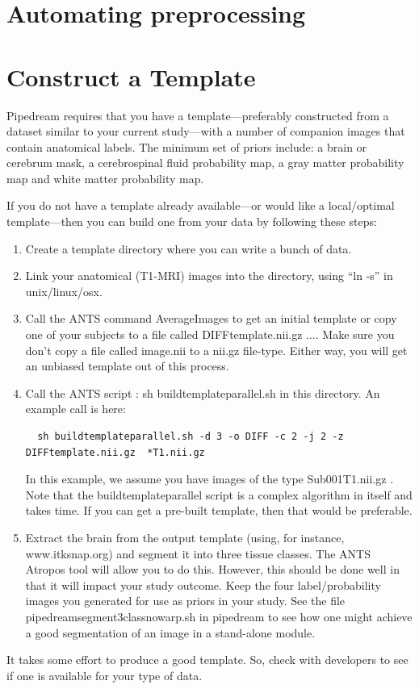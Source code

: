 \documentclass{InsightArticle}
\begin{document}


\section{Automating preprocessing}




\section{Construct a Template}
Pipedream requires that you have a template---preferably constructed
from a dataset similar to your current study---with a number of
companion images that contain anatomical labels.  The minimum set of
priors include: a brain or cerebrum mask, a cerebrospinal fluid
probability map, a gray matter probability map and white matter
probability map.

If you do not have a template already available---or would like a local/optimal 
template---then you can build one from your data by following these steps:
\begin{enumerate}
\item Create a template directory where you can write a bunch of data.
\item Link your anatomical (T1-MRI) images into the directory, using ``ln -s'' in unix/linux/osx.
\item Call the ANTS command AverageImages to get an initial template
  or copy one of your subjects to a file called DIFFtemplate.nii.gz
  .... Make sure you don't copy a file called image.nii to a nii.gz
  file-type.  Either way, you will get an unbiased template out of this process.  
\item Call the ANTS script :   sh buildtemplateparallel.sh in this directory.  
  An example call is here: 
\begin{verbatim}
  sh buildtemplateparallel.sh -d 3 -o DIFF -c 2 -j 2 -z DIFFtemplate.nii.gz  *T1.nii.gz 
\end{verbatim}
  In this example, we assume you have images of the type   Sub001T1.nii.gz .
  Note that the buildtemplateparallel script is a complex algorithm in itself and takes time.  
  If you can get a pre-built template, then that would be preferable. 
\item  Extract the brain from the output template (using, for instance, www.itksnap.org) and segment it into three tissue classes.  
  The ANTS Atropos tool will allow you to do this.  However, this should be done well in that 
  it will impact your study outcome.   Keep the four label/probability images you generated for use as priors in your study. 
  See the file pipedreamsegment3classnowarp.sh in pipedream to see how one might achieve a good segmentation of an image 
  in a stand-alone module.  
\end{enumerate}
It takes some effort to produce a good template.  So, check with developers to see 
if one is available for your type of data.
\end{document}
